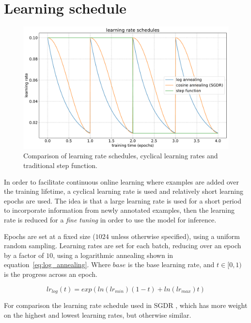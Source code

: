 \section {Learning schedule}
\label{sec:schedule}

\begin{figure}[h]
  \centering
  \includegraphics[width=1.0\linewidth]{charts/training/lr_schedules.pdf}
  \caption{Comparison of learning rate schedules, cyclical learning rates and traditional step function.  }  
  \label{fig:lr_schedule}
\end{figure}

In order to facilitate continuous online learning where examples are added over the training lifetime, a cyclical learning rate is used and relatively short learning epochs are used. The idea is that a large learning rate is used for a short period to incorporate information from newly annotated examples, then the learning rate is reduced for a \emph{fine tuning} in order to use the model for inference.

Epochs are set at a fixed size ($1024$ unless otherwise specified), using a uniform random sampling. Learning rates are set for each batch, reducing over an epoch by a factor of $10$, using a logarithmic annealing shown in equation~\ref{eq:log_annealing}. Where $base$ is the base learning rate, and $ t \in [0, 1) $ is the progress across an epoch.

\begin{equation}
lr_{log}(t) = exp(ln (lr_{min}) (1 - t) + ln(lr_{max})  t)
\label{eq:log_annealing}
\end{equation}

For comparison the learning rate schedule used in \gls{SGDR} \cite{Loshchilov2016}, which has more weight on the highest and lowest learning rates, but otherwise similar.

